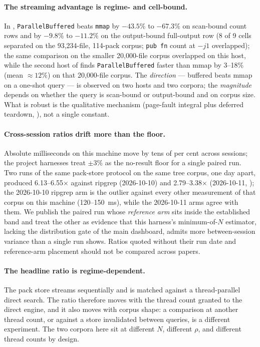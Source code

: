 \documentclass[11pt,letterpaper]{article}
\begin{document}
\paragraph{The streaming advantage is regime- and cell-bound.}
In , \texttt{ParallelBuffered} beats \texttt{mmap} by
$-43.5\%$ to $-67.3\%$ on scan-bound count rows and by $-9.8\%$ to $-11.2\%$
on the output-bound full-output row (8 of 9 cells separated on the
93{,}234-file, 114-pack corpus; \texttt{pub fn} count at $-j1$ overlapped);
the same comparison on the smaller 20{,}000-file corpus overlapped on this
host, while the second host of  finds
\texttt{ParallelBuffered} faster than mmap by 3--18\% (mean $\approx 12\%$)
on that 20{,}000-file corpus. The \emph{direction} --- buffered beats mmap
on a one-shot query --- is observed on two hosts and two corpora; the
\emph{magnitude} depends on whether the query is scan-bound or output-bound
and on corpus size. What is robust is the qualitative mechanism (page-fault
integral plus deferred teardown, ), not a single constant.

\paragraph{Cross-session ratios drift more than the floor.}
Absolute milliseconds on this machine move by tens of per cent across
sessions; the project harnesses treat $\pm 3\%$ as the no-result floor for a
single paired run. Two runs of the same pack-store protocol on the same
tree corpus, one day apart, produced 6.13--6.55$\times$ against ripgrep
(2026-10-10) and 2.79--3.38$\times$ (2026-10-11, ); the
2026-10-10 ripgrep arm is the outlier against every other measurement of
that corpus on this machine (120--150~ms), while the 2026-10-11 arms agree
with them. We publish the paired run whose \emph{reference arm} sits inside
the established band and treat the other as evidence that this harness's
minimum-of-$N$ estimator, lacking the distribution gate of the main
dashboard, admits more between-session variance than a single run shows.
Ratios quoted without their run date and reference-arm placement should not
be compared across papers.

\paragraph{The headline ratio is regime-dependent.}
The pack store streams sequentially and is matched against a
thread-parallel direct search. The ratio therefore moves with the thread
count granted to the direct engine, and it also moves with corpus shape:
a comparison at another thread count, or against a store invalidated
between queries, is a different experiment. The two corpora here sit at
different $N$, different $\rho$, and different thread counts by design.
\end{document}
